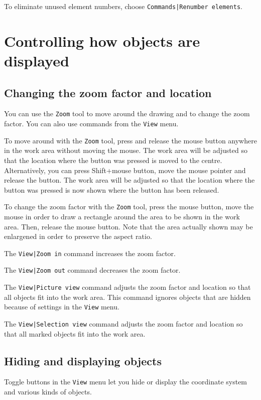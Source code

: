 \documentclass[a4paper,10pt]{report}
\begin{document}
To eliminate unused element numbers, choose {\tt Commands|Renumber elements}.

\section{Controlling how objects are displayed}

\subsection{Changing the zoom factor and location}

You can use the {\tt Zoom} tool to move around the drawing and to change the
zoom factor. You can also use commands from the {\tt View} menu.

To move around with the {\tt Zoom} tool, press and release the mouse
button anywhere in the work area without moving the mouse. The work
area will be adjusted so that the location where the button was
pressed is moved to the centre. Alternatively, you can press
Shift+mouse button, move the mouse pointer and release the button. The
work area will be adjusted so that the location where the button was
pressed is now shown where the button has been released.

To change the zoom factor with the {\tt Zoom} tool, press the mouse
button, move the mouse in order to draw a rectangle around the area to
be shown in the work area. Then, release the mouse button. Note that
the area actually shown may be enlargened in order to preserve the
aspect ratio.

The {\tt View|Zoom in} command increases the zoom factor.

The {\tt View|Zoom out} command decreases the zoom factor.

The {\tt View|Picture view} command adjusts the zoom factor and
location so that all objects fit into the work area. This command
ignores objects that are hidden because of settings in the {\tt View} menu.

The {\tt View|Selection view} command adjusts the zoom factor and
location so that all marked objects fit into the work area.

\subsection{Hiding and displaying objects}

Toggle buttons in the {\tt View} menu let you hide or display the coordinate
system and various kinds of objects.
\end{document}
